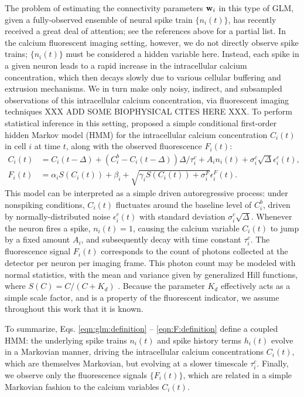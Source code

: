 The problem of estimating the connectivity parameters $\mathbf{w}_i$ in this
type of GLM, given a fully-observed ensemble of neural spike train
$\{n_i(t)\}$, has recently received a great deal of attention; see the
references above for a partial list.  In the calcium fluorescent
imaging setting, however, we do not directly observe spike trains;
$\{n_i(t)\}$ must be considered a hidden variable here.  Instead, each
spike in a given neuron leads to a rapid increase in the intracellular
calcium concentration, which then decays slowly due to various
cellular buffering and extrusion mechanisms.  We in turn make only
noisy, indirect, and subsampled observations of this intracellular
calcium concentration, via fluorescent imaging techniques XXX ADD SOME
BIOPHYSICAL CITES HERE XXX.  To perform statistical inference in this
setting, \cite{Vogelstein2009} proposed a simple conditional
first-order hidden Markov model (HMM) for the intracellular calcium
concentration $C_i(t)$ in cell $i$ at time $t$, along with the
observed fluorescence $F_i(t)$:
\begin{align} \label{eqn:ca:definition}
C_i(t) &= C_i(t-\Delta) + (C_i^b-C_i(t-\Delta)) \Delta/\tau^c_i + A_i
n_i(t)+\sigma^c_i \sqrt{\Delta} \epsilon^c_i(t), \\ F_i(t) &= \alpha_i
S(C_i(t)) + \beta_i + \sqrt{\gamma_i S(C_i(t)) + \sigma^F_i}
\epsilon^F_i(t). \label{eqn:F:definition}
\end{align}
This model can be interpreted as a simple driven autoregressive
process: under nonspiking conditions, $C_i(t)$ fluctuates around the
baseline level of $C_i^b$, driven by normally-distributed noise
$\epsilon^c_i(t)$ with standard deviation $\sigma^c_i \sqrt{\Delta}$.
Whenever the neuron fires a spike, $n_i(t)=1$, causing the calcium
variable $C_i(t)$ to jump by a fixed amount $A_i$, and subsequently
decay with time constant $\tau^c_i$.  The fluorescence signal $F_i(t)$
corresponds to the count of photons collected at the detector per
neuron per imaging frame.  This photon count may be modeled with
normal statistics, with the mean and variance given by generalized
Hill functions, where $S(C)=C/(C+K_d)$ \cite{Yasuda2004}.  Because the
parameter $K_d$ effectively acts as a simple scale factor, and is a
property of the fluorescent indicator, we assume throughout this work
that it is known.

To summarize, Eqs. \eqref{eqn:glm:definition} --
\eqref{eqn:F:definition} define a coupled HMM: the underlying spike
trains $n_i(t)$ and spike history terms $h_i(t)$ evolve in a Markovian
manner, driving the intracellular calcium concentrations $C_i(t)$,
which are themselves Markovian, but evolving at a slower timescale
$\tau_i^c$.  Finally, we observe only the fluorescence signals
$\{F_i(t)\}$, which are related in a simple Markovian fashion to the
calcium variables $C_i(t)$.


